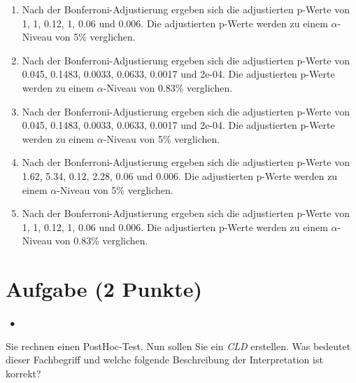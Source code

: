 \documentclass[a4paper, 9pt]{scrartcl}\usepackage[]{graphicx}\usepackage[]{xcolor}
\begin{document}
\begin{enumerate}
\item [\textbf{A} \msquare] Nach der Bonferroni-Adjustierung ergeben sich die adjustierten p-Werte von 1, 1, 0.12, 1, 0.06 und 0.006. Die adjustierten p-Werte werden zu einem $\alpha$-Niveau von 5\% verglichen.
\item [\textbf{B} \msquare] Nach der Bonferroni-Adjustierung ergeben sich die adjustierten p-Werte von 0.045, 0.1483, 0.0033, 0.0633, 0.0017 und 2e-04. Die adjustierten p-Werte werden zu einem $\alpha$-Niveau von 0.83\% verglichen.
\item [\textbf{C} \msquare] Nach der Bonferroni-Adjustierung ergeben sich die adjustierten p-Werte von 0.045, 0.1483, 0.0033, 0.0633, 0.0017 und 2e-04. Die adjustierten p-Werte werden zu einem $\alpha$-Niveau von 5\% verglichen.
\item [\textbf{D} \msquare] Nach der Bonferroni-Adjustierung ergeben sich die adjustierten p-Werte von 1.62, 5.34, 0.12, 2.28, 0.06 und 0.006. Die adjustierten p-Werte werden zu einem $\alpha$-Niveau von 5\% verglichen.
\item [\textbf{E} \msquare] Nach der Bonferroni-Adjustierung ergeben sich die adjustierten p-Werte von 1, 1, 0.12, 1, 0.06 und 0.006. Die adjustierten p-Werte werden zu einem $\alpha$-Niveau von 0.83\% verglichen.
\end{enumerate}

\section{Aufgabe \hfill (2 Punkte)}

\ifcollection
\begin{flushright}
\tiny\vspace{-2Ex}
\textbf{\examinhaltstart}
\exammodulestatversuch $\;\bullet$
\exammodulebiostat
\vspace{-1Ex}
\end{flushright}
\fi




Sie rechnen einen PostHoc-Test. Nun sollen Sie ein \textit{CLD} erstellen. Was bedeutet dieser Fachbegriff und welche folgende Beschreibung der Interpretation ist korrekt?
\end{document}
